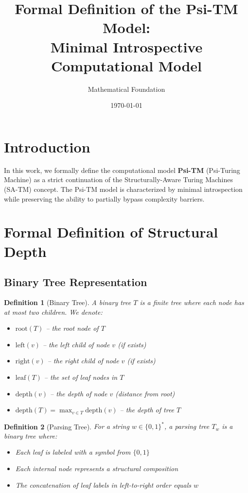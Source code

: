 \documentclass[11pt]{article}
\title{Formal Definition of the Psi-TM Model:\\
Minimal Introspective Computational Model}
\author{Mathematical Foundation}
\date{\today}
\newtheorem{definition}{Definition}
\begin{document}
\maketitle

\section{Introduction}

In this work, we formally define the computational model \textbf{Psi-TM} (Psi-Turing Machine) as a strict continuation of the Structurally-Aware Turing Machines (SA-TM) concept. The Psi-TM model is characterized by minimal introspection while preserving the ability to partially bypass complexity barriers.

\section{Formal Definition of Structural Depth}

\subsection{Binary Tree Representation}

\begin{definition}[Binary Tree]
A binary tree $T$ is a finite tree where each node has at most two children. We denote:
\begin{itemize}
\item $\text{root}(T)$ -- the root node of $T$
\item $\text{left}(v)$ -- the left child of node $v$ (if exists)
\item $\text{right}(v)$ -- the right child of node $v$ (if exists)
\item $\text{leaf}(T)$ -- the set of leaf nodes in $T$
\item $\text{depth}(v)$ -- the depth of node $v$ (distance from root)
\item $\text{depth}(T) = \max_{v \in T} \text{depth}(v)$ -- the depth of tree $T$
\end{itemize}
\end{definition}

\begin{definition}[Parsing Tree]
For a string $w \in \{0,1\}^*$, a parsing tree $T_w$ is a binary tree where:
\begin{itemize}
\item Each leaf is labeled with a symbol from $\{0,1\}$
\item Each internal node represents a structural composition
\item The concatenation of leaf labels in left-to-right order equals $w$
\end{itemize}
\end{definition}
\end{document}
